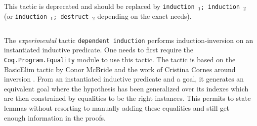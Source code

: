 This tactic is deprecated and should be replaced by {\tt induction \ident$_1$; induction \ident$_2$} (or {\tt induction \ident$_1$; destruct \ident$_2$} depending on the exact needs).





\subsection{}
\label{DepInduction}

The \emph{experimental} tactic \texttt{dependent induction} performs
induction-inversion on an instantiated inductive predicate.
One needs to first require the {\tt Coq.Program.Equality} module to use
this tactic. The tactic is based on the BasicElim tactic by Conor
McBride \cite{DBLP:conf/types/McBride00} and the work of Cristina Cornes
around inversion \cite{DBLP:conf/types/CornesT95}. From an instantiated
inductive predicate and a goal, it generates an equivalent goal where the
hypothesis has been generalized over its indexes which are then
constrained by equalities to be the right instances. This permits to
state lemmas without resorting to manually adding these equalities and
still get enough information in the proofs.

